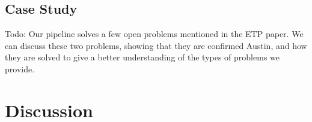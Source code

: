 \documentclass[letterpaper]{article} %
\begin{document}
\subsection{Case Study}
Todo:
Our pipeline solves a few open problems mentioned in the ETP paper. We can discuss these two problems, showing that they are confirmed Austin, and how they are solved to give a better understanding of the types of problems we provide. 





\section{Discussion}




% 
\end{document}
